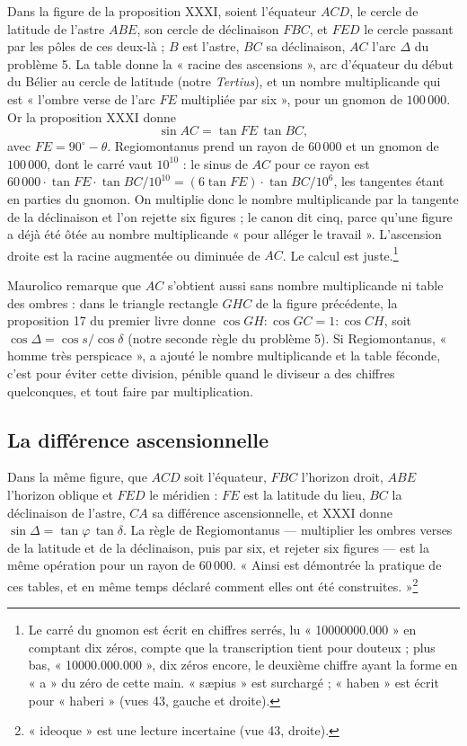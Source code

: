 \documentclass[11pt,a4paper]{article}
\begin{document}
Dans la figure de la proposition XXXI, soient l'équateur $ACD$, le cercle de
latitude de l'astre $ABE$, son cercle de déclinaison $FBC$, et $FED$ le cercle
passant par les pôles de ces deux-là ; $B$ est l'astre, $BC$ sa déclinaison, $AC$
l'arc $\Delta$ du problème 5. La table donne la « racine des ascensions », arc
d'équateur du début du Bélier au cercle de latitude (notre \emph{Tertius}), et un
nombre multiplicande qui est « l'ombre verse de l'arc $FE$ multipliée par six »,
pour un gnomon de $100\,000$. Or la proposition XXXI donne
\[
\sin AC = \tan FE\,\tan BC ,
\]
avec $FE = 90^\circ - \theta$. Regiomontanus prend un rayon de $60\,000$ et un
gnomon de $100\,000$, dont le carré vaut $10^{10}$ : le sinus de $AC$ pour ce rayon
est $60\,000\cdot\tan FE\cdot\tan BC/10^{10} = (6\tan FE)\cdot\tan BC/10^{6}$, les
tangentes étant en parties du gnomon. On multiplie donc le nombre multiplicande
par la tangente de la déclinaison et l'on rejette six figures ; le canon dit
cinq, parce qu'une figure a déjà été ôtée au nombre multiplicande « pour alléger
le travail ». L'ascension droite est la racine augmentée ou diminuée de $AC$.
Le calcul est juste.\footnote{Le carré du gnomon est écrit en chiffres serrés,
lu « 10000000.000 » en comptant dix zéros, compte que la transcription tient
pour douteux ; plus bas, « 10000.000.000 », dix zéros encore, le deuxième chiffre
ayant la forme en « a » du zéro de cette main. « sæpius » est surchargé ;
« haben » est écrit pour « haberi » (vues 43, gauche et droite).}

Maurolico remarque que $AC$ s'obtient aussi sans nombre multiplicande ni table
des ombres : dans le triangle rectangle $GHC$ de la figure précédente, la
proposition 17 du premier livre donne $\cos GH : \cos GC = 1 : \cos CH$, soit
$\cos\Delta = \cos s/\cos\delta$ (notre seconde règle du problème 5). Si
Regiomontanus, « homme très perspicace », a ajouté le nombre multiplicande et la
table féconde, c'est pour éviter cette division, pénible quand le diviseur a des
chiffres quelconques, et tout faire par multiplication.

\subsection*{La différence ascensionnelle}

Dans la même figure, que $ACD$ soit l'équateur, $FBC$ l'horizon droit, $ABE$
l'horizon oblique et $FED$ le méridien : $FE$ est la latitude du lieu, $BC$ la
déclinaison de l'astre, $CA$ sa différence ascensionnelle, et XXXI donne
$\sin\Delta = \tan\varphi\,\tan\delta$. La règle de Regiomontanus — multiplier les
ombres verses de la latitude et de la déclinaison, puis par six, et rejeter six
figures — est la même opération pour un rayon de $60\,000$. « Ainsi est démontrée
la pratique de ces tables, et en même temps déclaré comment elles ont été
construites. »\footnote{« ideoque » est une lecture incertaine (vue 43, droite).}
\end{document}
